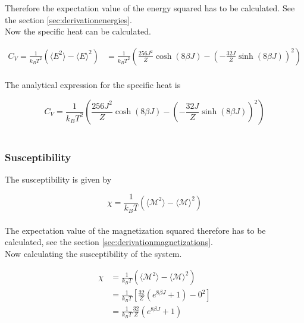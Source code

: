 \documentclass{article}
\begin{document}
Therefore the expectation value of the energy squared has to be calculated. See the section \ref{sec:derivationenergies}. \\

Now the specific heat can be calculated.

\begin{align*}
    C_V = \frac{1}{k_B T^2} \left( \langle E^2 \rangle - \langle E \rangle ^2 \right)
    &= \frac{1}{k_B T^2} \left( \frac{256 J^2}{Z} \cosh (8 \beta J) - \left( - \frac{32 J}{Z} \sinh(8 \beta J ) \right) ^2 \right)
\end{align*} \\

The analytical expression for the specific heat is

\begin{equation} \label{eq:finalspecificheat}
    C_V = \frac{1}{k_B T^2} \left( \frac{256 J^2}{Z} \cosh (8 \beta J) - \left( - \frac{32 J}{Z} \sinh(8 \beta J ) \right) ^2 \right)
\end{equation} \\


\subsubsection{Susceptibility} \label{sec:susceptibility}

The susceptibility is given by

\begin{equation}    \label{eq:susceptibility}
    \chi = \frac{1}{k_B T} \left( \langle \mathcal{M}^2 \rangle - \langle \mathcal{M} \rangle ^2 \right)
\end{equation} \\

The expectation value of the magnetization squared therefore has to be calculated, see the section \ref{sec:derivationmagnetizations}. \\

Now calculating the susceptibility of the system.

\begin{align*}
    \chi &= \frac{1}{k_B T} \left( \langle \mathcal{M}^2 \rangle - \langle \mathcal{M} \rangle ^2 \right) \\
    &= \frac{1}{k_B T} \left[ \frac{32}{Z} \left( e^{8 \beta J} + 1 \right) - 0^2 \right] \\
    &= \frac{1}{k_B T} \frac{32}{Z} \left( e^{8 \beta J} + 1 \right) \\
\end{align*}
\end{document}
